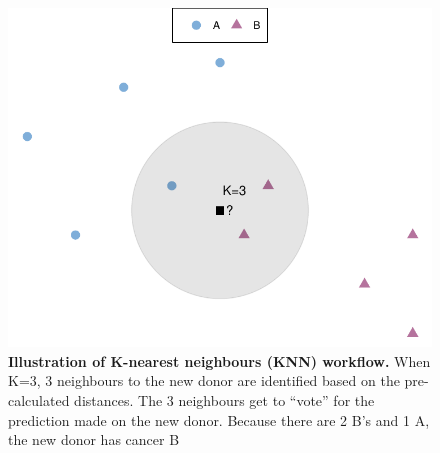 \begin{figure}[h!]
    \centering
    \includegraphics[scale=0.8]{graphics/knn_demo.pdf}
    \caption{\textbf{Illustration of K-nearest neighbours (KNN) workflow.} When K=3, 3 neighbours to the new donor are identified based on the pre-calculated distances. The 3 neighbours get to ``vote'' for the prediction made on the new donor. Because there are 2 B's and 1 A, the new donor has cancer B}
    \label{fig:knn_demo}
\end{figure}
